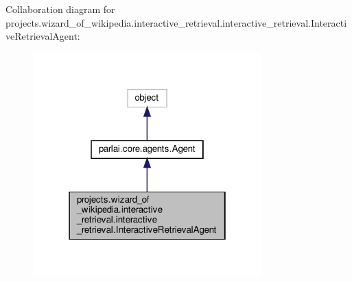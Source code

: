 Collaboration diagram for projects.\+wizard\+\_\+of\+\_\+wikipedia.\+interactive\+\_\+retrieval.\+interactive\+\_\+retrieval.\+Interactive\+Retrieval\+Agent\+:
\nopagebreak
\begin{figure}[H]
\begin{center}
\leavevmode
\includegraphics[width=250pt]{classprojects_1_1wizard__of__wikipedia_1_1interactive__retrieval_1_1interactive__retrieval_1_1In6e03392574af0d88610392e9d03e2b03}
\end{center}
\end{figure}

